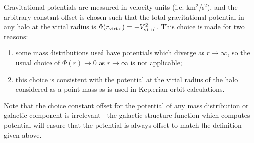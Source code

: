 Gravitational potentials are measured in velocity units (i.e. km$^2$/s$^2$), and the arbitrary constant offset is chosen such that the total gravitational potential in any halo at the virial radius is $\Phi(r_{\rm virial})=-V_{\rm virial}^2$. This choice is made for two reasons:
\begin{enumerate}
\item some mass distributions used have potentials which diverge as $r\rightarrow\infty$, so the usual choice of $\Phi(r) \rightarrow 0$ as $r \rightarrow \infty$ is not applicable;
\item this choice is consistent with the potential at the virial radius of the halo considered as a point mass as is used in Keplerian orbit calculations.
\end{enumerate}
Note that the choice constant offset for the potential of any mass distribution or galactic component is irrelevant---the galactic structure function which computes potential will ensure that the potential is always offset to match the definition given above.
